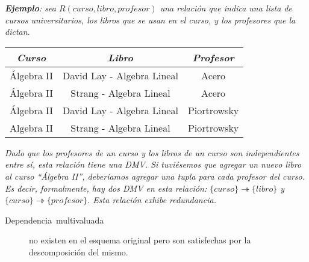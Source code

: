 \documentclass[a4paper, twoside]{article}
\begin{document}
\textbf{\emph{Ejemplo}}\emph{: sea $R(curso,libro,profesor)$ una
relación que indica una lista de cursos universitarios, los libros
que se usan en el curso, y los profesores que la dictan.}

\noindent \begin{center}
\begin{tabular}{|c|c|c|}
\hline 
\emph{Curso} & \emph{Libro} & \emph{Profesor}\\
\hline 
\hline 
Álgebra II & David Lay - Algebra Lineal & Acero\\
\hline 
Álgebra II & Strang - Algebra Lineal & Acero\\
\hline 
Álgebra II & David Lay - Algebra Lineal & Piortrowsky\\
\hline 
Algebra II & Strang - Algebra Lineal & Piortrowsky\\
\hline 
\end{tabular}
\par\end{center}

\emph{Dado que los profesores de un curso y los libros de un curso
son independientes entre sí, esta relación tiene una DMV. Si tuviésemos
que agregar un nuevo libro al curso ``Álgebra II'', deberíamos agregar
una tupla para cada profesor del curso. Es decir, formalmente, hay
dos DMV en esta relación: $\{curso\}\twoheadrightarrow\{libro\}$
y $\{curso\}\twoheadrightarrow\{profesor\}$. Esta relación exhibe
redundancia.}
\begin{description}
\item [{Dependencia~multivaluada}] no existen en el esquema original pero
son satisfechas por la descomposición del mismo.
\end{description}
\end{document}
